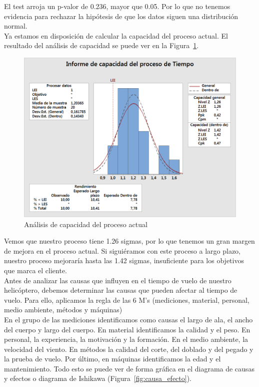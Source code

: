\documentclass[12pt,a4paper,twoside,openright,titlepage,final]{article}
\begin{document}
El test arroja un p-valor de 0.236, mayor que 0.05. Por lo que no tenemos evidencia para rechazar la hipótesis de que los datos siguen una distribución normal.\\

Ya estamos en disposición de calcular la capacidad del proceso actual. El resultado del análisis de capacidad se puede ver en la Figura~\ref{fig:capacidad_actual}.\\ 

\begin{figure}[htbp!]
	\centering
	\includegraphics[width=0.7\linewidth]{imagenes/Informe_de_capacidad_del_proceso_de_Tiempo}
	\caption{Análisis de capacidad del proceso actual}
	\label{fig:capacidad_actual}
\end{figure}

Vemos que nuestro proceso tiene 1.26 sigmas, por lo que tenemos un gran margen de mejora en el proceso actual. Si siguiéramos con este proceso a largo plazo, nuestro proceso mejoraría hasta las 1.42 sigmas, insuficiente para los objetivos que marca el cliente.\\

Antes de analizar las causas que influyen en el tiempo de vuelo de nuestro helicóptero, debemos determinar las causas que pueden afectar al tiempo de vuelo. Para ello, aplicamos la regla de las 6 M's (mediciones, material, personal, medio ambiente, métodos y máquinas)\\

En el grupo de las mediciones identificamos como causas el largo de ala, el ancho del cuerpo y largo del cuerpo. En material identificamos la calidad y el peso. En personal, la experiencia, la motivación y la formación. En el medio ambiente, la velocidad del viento. En métodos la calidad del corte, del doblado y del pegado y la prueba de vuelo. Por último, en máquinas identificamos la edad y el mantenimiento. Todo esto se puede ver de forma gráfica en el diagrama de causas y efectos o diagrama de Ishikawa (Figura~\ref{fig:causa_efecto}).\\
\end{document}
